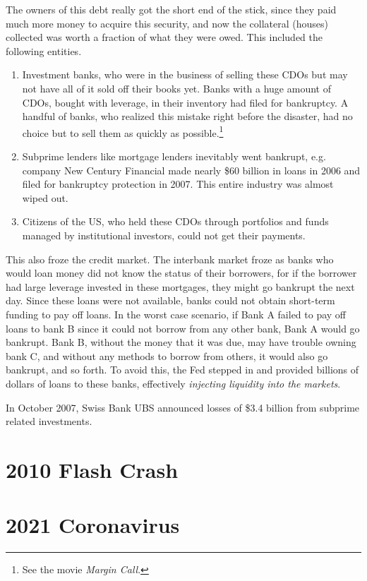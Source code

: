 \documentclass{article}
\begin{document}
  The owners of this debt really got the short end of the stick, since they paid much more money to acquire this security, and now the collateral (houses) collected was worth a fraction of what they were owed. This included the following entities. 
  \begin{enumerate}
    \item Investment banks, who were in the business of selling these CDOs but may not have all of it sold off their books yet. Banks with a huge amount of CDOs, bought with leverage, in their inventory had filed for bankruptcy. A handful of banks, who realized this mistake right before the disaster, had no choice but to sell them as quickly as possible.\footnote{See the movie \textit{Margin Call}. } 
    \item Subprime lenders like mortgage lenders inevitably went bankrupt, e.g. company New Century Financial made nearly \$60 billion in loans in 2006 and filed for bankruptcy protection in 2007. This entire industry was almost wiped out. 
    \item Citizens of the US, who held these CDOs through portfolios and funds managed by institutional investors, could not get their payments. 
  \end{enumerate}
  This also froze the credit market. The interbank market froze as banks who would loan money did not know the status of their borrowers, for if the borrower had large leverage invested in these mortgages, they might go bankrupt the next day. Since these loans were not available, banks could not obtain short-term funding to pay off loans. In the worst case scenario, if Bank A failed to pay off loans to bank B since it could not borrow from any other bank, Bank A would go bankrupt. Bank B, without the money that it was due, may have trouble owning bank C, and without any methods to borrow from others, it would also go bankrupt, and so forth. To avoid this, the Fed stepped in and provided billions of dollars of loans to these banks, effectively \textit{injecting liquidity into the markets}. 

  In October 2007, Swiss Bank UBS announced losses of \$3.4 billion from subprime related investments. 



\section{2010 Flash Crash}


\section{2021 Coronavirus}
\end{document}
